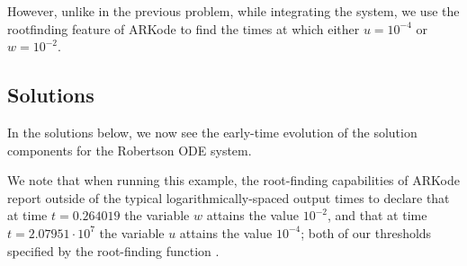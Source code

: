 \documentclass[letterpaper,10pt,english]{sphinxmanual}
\begin{document}
However, unlike in the previous problem, while integrating the system,
we use the rootfinding feature of ARKode to find the times at which
either \(u=10^{-4}\) or \(w=10^{-2}\).


\subsection{Solutions}
\label{c_serial:id17}
In the solutions below, we now see the early-time evolution of the
solution components for the Robertson ODE system.
\begin{figure}[htbp]
\centering

\end{figure}

We note that when running this example, the root-finding capabilities
of ARKode report outside of the typical logarithmically-spaced output
times to declare that at time \(t=0.264019\) the variable
\(w\) attains the value \(10^{-2}\), and that at time
\(t=2.07951\cdot10^{7}\) the variable \(u\) attains the value
\(10^{-4}\); both of our thresholds specified by the root-finding
function .
\end{document}
